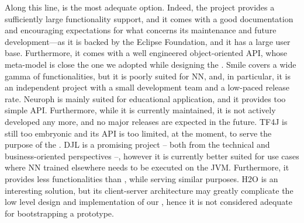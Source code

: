 \documentclass[12pt,a4paper,openright,twoside]{book}
\begin{document}
Along this line, \dlfj{} is the most adequate option.
%
Indeed, the project provides a sufficiently large functionality support, and it comes with a good documentation and encouraging expectations for what concerns its maintenance and future development---as it is backed by the Eclipse Foundation, and it has a large user base.
%
Furthermore, it comes with a well engineered object-oriented API, whose meta-model is close the one we adopted while designing the \mllib{}.
%
Smile covers a wide gamma of functionalities, but it is poorly suited for NN, and, in particular, it is an independent project with a small development team and a low-paced release rate.
%
Neuroph is mainly suited for educational application, and it provides too simple API.
%
Furthermore, while it is currently maintained, it is not actively developed any more, and no major releases are expected in the future.
%
TF4J is still too embryonic and its API is too limited, at the moment, to serve the purpose of the \mllib{}.
%
DJL is a promising project -- both from the technical and business-oriented perspectives --, however it is currently better suited for use cases where NN trained elsewhere needs to be executed on the JVM.
%
Furthermore, it provides less functionalities than \dlfj{}, while serving similar purposes.
%
H2O is an interesting solution, but its client-server architecture may greatly complicate the low level design and implementation of our \mllib{}, hence it is not considered adequate for bootstrapping a prototype.
\end{document}
